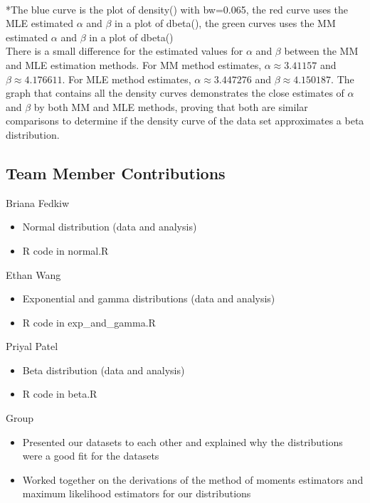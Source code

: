 \documentclass[12pt, letterpaper]{article}
\begin{document}
\footnotesize
\\ \**The blue curve is the plot of density() with bw=0.065, the red curve uses the MLE estimated ${\alpha}$ and ${\beta}$ in a plot of dbeta(), the green curves uses the MM estimated ${\alpha}$ and ${\beta}$ in a plot of dbeta() \\
\normalsize 
There is a small difference for the estimated values for ${\alpha}$ and ${\beta}$ between the MM and MLE estimation methods. For MM method estimates, $\alpha \approx 3.41157$ and $\beta \approx 4.176611$. For MLE method estimates, $\alpha \approx 3.447276$ and $\beta \approx 4.150187$. The graph that contains all the density curves demonstrates the close estimates of ${\alpha}$ and ${\beta}$ by both MM and MLE methods, proving that both are similar comparisons to determine if the density curve of the data set approximates a beta distribution.

\newpage
\begin{center}
    \section*{Team Member Contributions}
\end{center}

\normalsize
Briana Fedkiw
\begin{itemize}[leftmargin=50pt]
  \item Normal distribution (data and analysis)
  \item R code in normal.R
\end{itemize}

Ethan Wang
\begin{itemize}[leftmargin=50pt]
  \item Exponential and gamma distributions (data and analysis)
  \item R code in exp\_and\_gamma.R
\end{itemize}

Priyal Patel
\begin{itemize}[leftmargin=50pt]
  \item Beta distribution (data and analysis)
  \item R code in beta.R
\end{itemize}

Group
\begin{itemize}[leftmargin=50pt]
  \item Presented our datasets to each other and explained why the distributions were a good fit for the datasets
  \item Worked together on the derivations of the method of moments estimators and maximum likelihood estimators for our distributions
\end{itemize}
\end{document}
